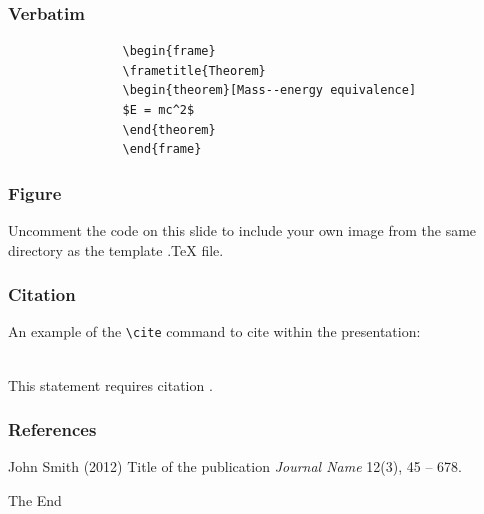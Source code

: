 \documentclass{beamer}
\begin{document}
		
		\begin{frame}[fragile] %
			\frametitle{Verbatim}
			\begin{example}
				\begin{verbatim}
				\begin{frame}
				\frametitle{Theorem}
				\begin{theorem}[Mass--energy equivalence]
				$E = mc^2$
				\end{theorem}
				\end{frame}\end{verbatim}
			\end{example}
		\end{frame}
		
		
		\begin{frame}
			\frametitle{Figure}
			Uncomment the code on this slide to include your own image from the same directory as the template .TeX file.
		\end{frame}
		
		
		\begin{frame}[fragile] %
			\frametitle{Citation}
			An example of the \verb|\cite| command to cite within the presentation:\\~
			
			This statement requires citation \cite{p1}.
		\end{frame}
		
		
		\begin{frame}
			\frametitle{References}
			\footnotesize{
				\begin{thebibliography}{99} %
					 John Smith (2012)
					\newblock Title of the publication
					\newblock \emph{Journal Name} 12(3), 45 -- 678.
				\end{thebibliography}
			}
		\end{frame}
		
		
		\begin{frame}
			\Huge{\centerline{The End}}
		\end{frame}
		
		
	
\end{document}
